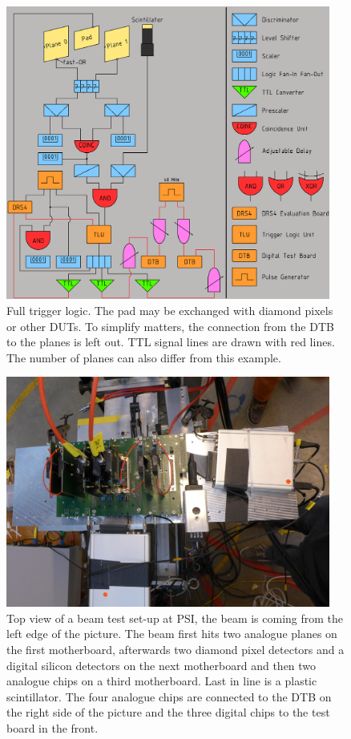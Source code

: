 \documentclass[british,11pt,a4paper]{memoir}
\begin{document}
\begin{figure}[ht]
	\centering
	\includegraphics[width=0.95\textwidth]{triglog2}
	\caption{Full trigger logic. The pad may be exchanged with diamond pixels or other \ac{DUT}s. To simplify matters, the connection from the \ac{DTB} to the planes is left out. \ac{TTL} signal lines are drawn with red lines. The number of planes can also differ from this example.}
	\label{plogic2}
\end{figure}\no
\begin{figure}[ht]
	\centering
	\includegraphics[width=0.95\textwidth]{setup/fullsetup}
	\caption{Top view of a beam test set-up at \ac{PSI}, the beam is coming from the left edge of the picture. The beam first hits two analogue planes on the first motherboard, afterwards two diamond pixel detectors and a digital silicon detectors on the next motherboard and then two analogue chips on a third motherboard. Last in line is a plastic scintillator. The four analogue chips are connected to the \ac{DTB} on the right side of the picture and the three digital chips to the test board in the front.}
	\label{sdut1}
\end{figure}\no
\end{document}
